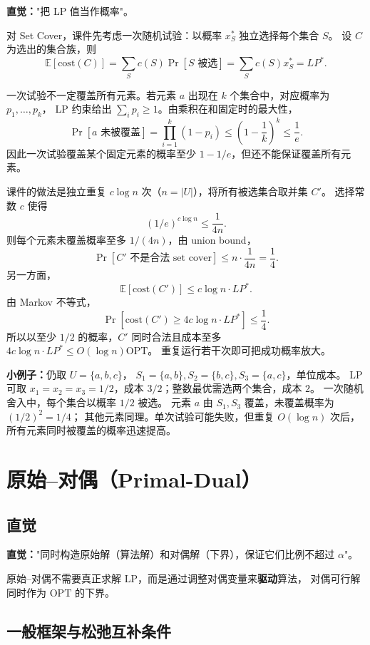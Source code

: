 \documentclass[UTF8,openany,12pt]{ctexbook}
\theoremstyle{remark}
\newcommand{\OPT}{\mathrm{OPT}}
\begin{document}
\textbf{直觉：}"把 LP 值当作概率"。

对 Set Cover，课件先考虑一次随机试验：以概率 $x_S^*$ 独立选择每个集合 $S$。
设 $C$ 为选出的集合族，则
\[
  \mathbb E[\mathrm{cost}(C)]
  =\sum_{S}c(S)\Pr[S\text{ 被选}]
  =\sum_S c(S)x_S^*
  =LP^*.
\]

一次试验不一定覆盖所有元素。若元素 $a$ 出现在 $k$ 个集合中，对应概率为 $p_1,\dots,p_k$，
LP 约束给出 $\sum_i p_i\ge 1$。由乘积在和固定时的最大性，
\[
  \Pr[a\text{ 未被覆盖}]
  =\prod_{i=1}^k(1-p_i)
  \le \left(1-\frac1k\right)^k
  \le \frac1e.
\]
因此一次试验覆盖某个固定元素的概率至少 $1-1/e$，但还不能保证覆盖所有元素。

课件的做法是独立重复 $c\log n$ 次（$n=|U|$），将所有被选集合取并集 $C'$。
选择常数 $c$ 使得
\[
  (1/e)^{c\log n}\le \frac{1}{4n}.
\]
则每个元素未覆盖概率至多 $1/(4n)$，由 union bound，
\[
  \Pr[C'\text{ 不是合法 set cover}]\le n\cdot \frac1{4n}=\frac14.
\]
另一方面，
\[
  \mathbb E[\mathrm{cost}(C')]\le c\log n\cdot LP^*.
\]
由 Markov 不等式，
\[
  \Pr[\mathrm{cost}(C')\ge 4c\log n\cdot LP^*]\le \frac14.
\]
所以以至少 $1/2$ 的概率，$C'$ 同时合法且成本至多 $4c\log n\cdot LP^*\le O(\log n)\OPT$。
重复运行若干次即可把成功概率放大。

\textbf{小例子：}仍取 $U=\{a,b,c\}$，
$S_1=\{a,b\},S_2=\{b,c\},S_3=\{a,c\}$，单位成本。
LP 可取 $x_1=x_2=x_3=1/2$，成本 $3/2$；整数最优需选两个集合，成本 $2$。
一次随机舍入中，每个集合以概率 $1/2$ 被选。
元素 $a$ 由 $S_1,S_3$ 覆盖，未覆盖概率为 $(1/2)^2=1/4$；
其他元素同理。单次试验可能失败，但重复 $O(\log n)$ 次后，所有元素同时被覆盖的概率迅速提高。

\section{原始--对偶（Primal-Dual）}

\subsection{直觉}

\textbf{直觉：}"同时构造原始解（算法解）和对偶解（下界），保证它们比例不超过 $\alpha$"。

原始--对偶不需要真正求解 LP，而是通过调整对偶变量来\textbf{驱动}算法，
对偶可行解同时作为 $\OPT$ 的下界。

\subsection{一般框架与松弛互补条件}
\end{document}
